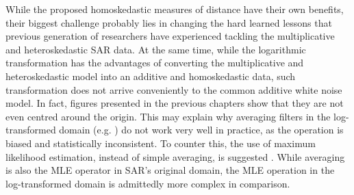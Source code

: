 While
                the proposed homoskedastic measures of distance have
                their own benefits, their biggest challenge probably
                lies in changing the hard learned lessons that
                previous generation of researchers have experienced tackling
                the multiplicative and heteroskedastic SAR data.
At
                the same time, while the logarithmic transformation has
                the advantages of converting the multiplicative and
                heteroskedastic model into an additive and homoskedastic
                data, such transformation does not arrive conveniently
                to the common additive white noise model.
In fact, figures presented in the previous chapters show that 
	they are not even centred around the origin. 
This may explain why averaging filters in the log-transformed domain (e.g. \cite{Arsenault_JOptSocAm_1976}) do not 
	work very well in practice, as the operation is biased and statistically inconsistent.
To counter this, the use of maximum likelihood estimation, instead of simple averaging, 
	is suggested \cite{Le_2011_ACRS}.
While averaging is also the MLE operator in SAR's original domain,
                the MLE operation in the log-transformed domain is admittedly more complex in comparison.

